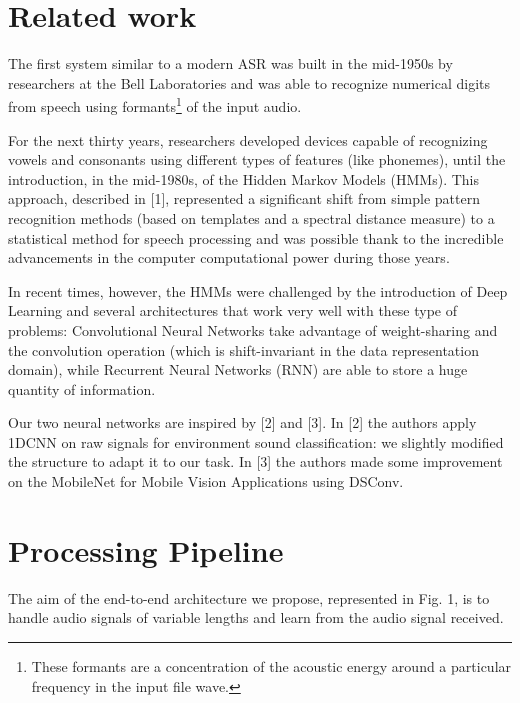 \documentclass[conference]{IEEEtran}
\begin{document}

\section{Related work}
The first system similar to a modern ASR was built in the mid-1950s by researchers at the Bell Laboratories and was able to recognize numerical digits from speech using formants\footnote{These formants are a concentration of the acoustic energy around a particular frequency in the input file wave.} of the input audio.  

For the next thirty years, researchers developed devices capable of recognizing vowels and consonants using different types of features (like phonemes), until the introduction, in the mid-1980s, of the Hidden Markov Models (HMMs). This approach, described in [1], represented a significant shift from simple pattern recognition methods (based on templates and a spectral distance measure) to a statistical method for speech processing and was possible thank to the incredible advancements in the computer computational power during those years.

In recent times, however, the HMMs were challenged by the introduction of Deep Learning and several architectures that work very well with these type of problems: Convolutional Neural Networks take advantage of weight-sharing and the convolution operation (which is shift-invariant in the data representation domain), while Recurrent Neural Networks (RNN) are able to store a huge quantity of information.

Our two neural networks are inspired by [2] and [3]. In [2] the authors apply 1DCNN on raw signals for environment sound classification: we slightly modified the structure to adapt it to our task. In [3] the authors made some improvement on the MobileNet for Mobile Vision Applications using DSConv. 
\hfill

\section{Processing Pipeline}
The aim of the end-to-end architecture we propose, represented in Fig. 1, is to handle audio signals of variable lengths and learn from the audio signal received.
\end{document}
